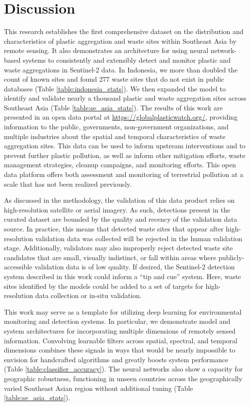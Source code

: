 \documentclass[10pt,letterpaper]{article}
\begin{document}
\section*{Discussion}
This research establishes the first comprehensive dataset on the distribution and characteristics of plastic aggregation and waste sites within Southeast Asia by remote sensing. It also demonstrates an architecture for using neural network-based systems to consistently and extensibly detect and monitor plastic and waste aggregations in Sentinel-2 data. In Indonesia, we more than doubled the count of known sites and found 277 waste sites that do not exist in public databases (Table \ref{table:indonesia_stats}). We then expanded the model to identify and validate nearly a thousand plastic and waste aggregation sites across Southeast Asia (Table \ref{table:se_asia_stats}). The results of this work are presented in an open data portal at \url{https://globalplasticwatch.org/}, providing information to the public, governments, non-government organizations, and multiple industries about the spatial and temporal characteristics of waste aggregation sites. This data can be used to inform upstream interventions and to prevent further plastic pollution, as well as inform other mitigation efforts, waste management strategies, cleanup campaigns, and monitoring efforts. This open data platform offers both assessment and monitoring of terrestrial pollution at a scale that has not been realized previously.

As discussed in the methodology, the validation of this data product relies on high-resolution satellite or aerial imagery. As such, detections present in the curated dataset are bounded by the quality and recency of the validation data source. In practice, this means that detected waste sites that appear after high-resolution validation data was collected will be rejected in the human validation stage. Additionally, validators may also improperly reject detected waste site candidates that are small, visually indistinct, or fall within areas where publicly-accessible validation data is of low quality. If desired, the Sentinel-2 detection system described in this work could inform a “tip and cue” system. Here, waste sites identified by the models could be added to a set of targets for high-resolution data collection or in-situ validation.

This work may serve as a template for utilizing deep learning for environmental monitoring and detection systems. In particular, we demonstrate model and system architectures for incorporating multiple dimensions of remotely sensed information. Convolving learnable filters across spatial, spectral, and temporal dimensions combines these signals in ways that would be nearly impossible to envision for handcrafted algorithms and greatly boosts system performance (Table \ref{table:classifier_accuracy}). The neural networks also show a capacity for geographic robustness, functioning in unseen countries across the geographically varied Southeast Asian region without additional tuning (Table \ref{table:se_asia_stats}).
\end{document}
